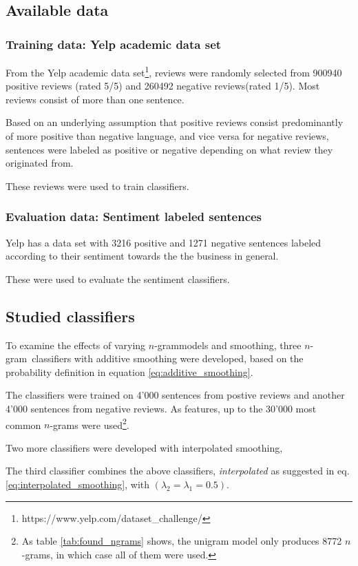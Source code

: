 \documentclass[a4paper,11pt]{kth-mag}
\newcommand{\ngram}{$n$-gram}
\begin{document}
\subsection{Available data}

\subsubsection{Training data: Yelp academic data set}
From the Yelp academic data set\footnote{https://www.yelp.com/dataset\_challenge/},
reviews were randomly selected from 900940 positive reviews (rated 5/5)
and 260492 negative reviews(rated 1/5). Most reviews consist of more than one sentence.

Based on an underlying assumption that positive reviews consist predominantly of more
positive than negative language, and vice versa for negative reviews,
sentences were labeled as positive or negative depending on what review they originated from.

These reviews were used to train classifiers.

\subsubsection{Evaluation data: Sentiment labeled sentences}
Yelp has a data set with 3216 positive and 1271 negative sentences labeled
according to their sentiment towards the the business in general.

These were used to evaluate the sentiment classifiers.

\subsection{Studied classifiers}
To examine the effects of varying \ngram models and smoothing,
three \ngram~classifiers with additive smoothing were developed, based on the
probability definition in equation \ref{eq:additive_smoothing}.

The classifiers were trained on 4'000 sentences from postive reviews
and another 4'000 sentences from negative reviews.
As features, up to the 30'000 most common \ngram s were used\footnote{As table
  \ref{tab:found_ngrams} shows, the unigram model only produces 8772 \ngram s,
  in which case all of them were used.}. %


Two more classifiers were developed with interpolated smoothing, 

The third classifier combines the above classifiers,
\emph{interpolated} as suggested in eq. \ref{eq:interpolated_smoothing}, with
$(\lambda_2=\lambda_1=0.5)$.
\end{document}
